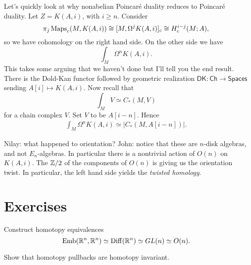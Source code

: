 \documentclass{amsart}
\DeclareMathOperator{\Emb}{Emb}
\begin{document}
\begin{remark}
    Let's quickly look at why nonabelian Poincar\'e duality reduces to Poincar\'e duality.
    Let $Z=K(A,i)$, with $i\geq n$. Consider
    \begin{equation*}
        \pi_j\operatorname{Maps}_c(M,K(A,i)) \cong [M, \Omega^jK(A,i)]_c \cong H^{i-j}_c(M;A),
    \end{equation*}
    so we have cohomology on the right hand side. On the other side we have
    \begin{equation*}
        \int_M \Omega^nK(A,i).
    \end{equation*}
    This takes some arguing that we haven't done but I'll tell you the end result.
    There is the Dold-Kan functor followed by geometric realization
    $\mathsf{DK}:\mathsf{Ch}\to\mathsf{Spaces}$ sending $A[i]\mapsto K(A,i)$. Now recall that
    \begin{equation*}
        \int_M V \simeq C_*(M,V)
    \end{equation*}
    for a chain complex $V$. Set $V$ to be $A[i-n]$. Hence
    \begin{align*}
        \int_M \Omega^n K(A,i) \simeq |C_*(M, A[i-n])|.
    \end{align*}

    Nilay: what happened to orientation?
    John: notice that these are $n$-disk algebras, and not $E_n$-algebras. In particular
    there is a nontrivial action of $O(n)$ on $K(A,i)$. The $\mathbb{Z}/2$ of the components of
    $O(n)$ is giving us the orientation twist. In particular, the left hand side yields
    the \textit{twisted homology}.
\end{remark}


\newpage

\appendix

\section{Exercises}

\begin{exercise}
    Construct homotopy equivalences
    \begin{equation*}
        \Emb(\R^n,\R^n) \simeq \Diff(\R^n) \simeq GL(n) \simeq O(n).
    \end{equation*}
\end{exercise}

\begin{exercise}
    Show that homotopy pullbacks are homotopy invariant.
\end{exercise}
\end{document}
